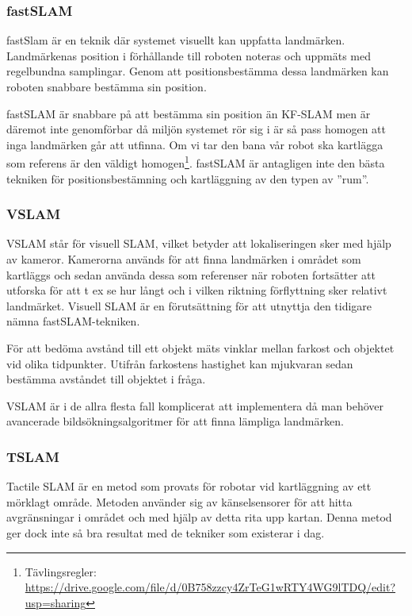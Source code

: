 \documentclass[a4paper,12pt,fleqn]{article}
\begin{document}
\subsubsection{fastSLAM}
fastSlam är en teknik där systemet visuellt kan uppfatta landmärken. Landmärkenas position i förhållande till roboten noteras och uppmäts med regelbundna samplingar. Genom att positionsbestämma dessa landmärken kan roboten snabbare bestämma sin position. 

fastSLAM är snabbare på att bestämma sin position än KF-SLAM men är däremot inte genomförbar då miljön systemet rör sig i är så pass homogen att inga landmärken går att utfinna. Om vi tar den bana vår robot ska kartlägga som referens är den väldigt homogen\footnote{Tävlingsregler: \url{https://drive.google.com/file/d/0B758zzcy4ZrTeG1wRTY4WG9lTDQ/edit?usp=sharing}}. fastSLAM är antagligen inte den bästa tekniken för positionsbestämning och kartläggning av den typen av ''rum''. 



\subsubsection{VSLAM}

VSLAM står för visuell SLAM, vilket betyder att lokaliseringen sker med hjälp av kameror. Kamerorna används för att finna landmärken i området som kartläggs och sedan använda dessa som referenser när roboten fortsätter att utforska för att t ex se hur långt och i vilken riktning förflyttning sker relativt landmärket. Visuell SLAM är en förutsättning för att utnyttja den tidigare nämna fastSLAM-tekniken. 

För att bedöma avstånd till ett objekt mäts vinklar mellan farkost och objektet vid olika tidpunkter. Utifrån farkostens hastighet kan mjukvaran sedan bestämma avståndet till objektet i fråga. 

VSLAM är i de allra flesta fall komplicerat att implementera då man behöver avancerade bildsökningsalgoritmer för att finna lämpliga landmärken. 

\subsubsection{TSLAM}
Tactile SLAM är en metod som provats för robotar vid kartläggning av ett mörklagt område. Metoden använder sig av känselsensorer för att hitta avgränsningar i området och med hjälp av detta rita upp kartan. Denna metod ger dock inte så bra resultat med de tekniker som existerar i dag.
\end{document}
